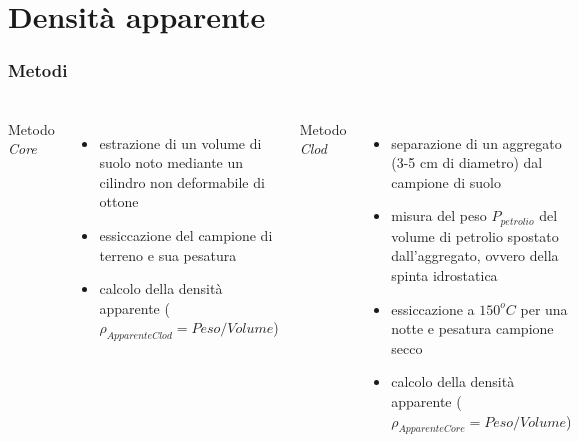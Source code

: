 \part{Densit\`a apparente}
\section{Metodi}
\begin{frame}
  \frametitle{} %
  \begin{columns}
    Metodo \emph{Core}
    \pause
    \begin{itemize}[<+->] 
    \item estrazione di un volume di suolo noto mediante un cilindro
      non deformabile di ottone
    \item essiccazione del campione di terreno e sua pesatura
    \item calcolo della densit\`a apparente
      ($\rho_{ApparenteClod} = Peso/Volume$)
    \end{itemize}




    Metodo \emph{Clod}
    \pause
    \begin{itemize}[<+->]
    \item separazione di un aggregato (3-5 cm di diametro) dal
      campione di suolo
    \item misura del peso $P_{petrolio}$ del volume di petrolio
      spostato dall'aggregato, ovvero della spinta idrostatica
    \item essiccazione a $150^oC$ per una notte e pesatura campione
      secco
    \item calcolo della densit\`a apparente
      ($\rho_{ApparenteCore} = Peso/Volume$)
    \end{itemize}
  \end{columns}
\end{frame}


